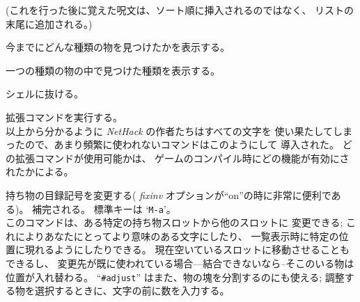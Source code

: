 (これを行った後に覚えた呪文は、ソート順に挿入されるのではなく、
リストの末尾に追加される。)
\item[\tb{$\backslash$}]
今までにどんな種類の物を見つけたかを表示する。
\item[\tb{\`}]
一つの種類の物の中で見つけた種類を表示する。
\item[\tb{!}]
シェルに抜ける。
\item[\tb{\#}]
拡張コマンドを実行する。\\
以上から分かるように {\it NetHack\/} の作者たちはすべての文字を
使い果たしてしまったので、あまり頻繁に使われないコマンドはこのようにして
導入された。
どの拡張コマンドが使用可能かは、
ゲームのコンパイル時にどの機能が有効にされたかによる。
\item[\tb{\#adjust}]
持ち物の目録記号を変更する(
{\it fixinv\/}
オプションが``on''の時に非常に便利である)。
補完される。
標準キーは `{\tt M-a}'。\\
このコマンドは、ある特定の持ち物スロットから他のスロットに
変更できる; これによりあなたにとってより意味のある文字にしたり、
一覧表示時に特定の位置に現れるようにしたりできる。
現在空いているスロットに移動させることもできるし、
変更先が既に使われている場合---結合できないなら--そこのいる物は
位置が入れ替わる。
``{\tt \#adjust}'' はまた、物の塊を分割するのにも使える;
調整する物を選択するときに、文字の前に数を入力する。
